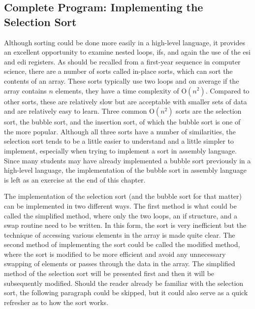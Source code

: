 \documentclass[10pt]{book}
\begin{document}
\subsection{Complete Program: Implementing the Selection Sort}
Although sorting could be done more easily in a high-level language, it provides an excellent opportunity to examine nested loops, ifs, and again the use of the esi and edi registers. As should be recalled from a first-year sequence in computer science, there are a number of sorts called in-place sorts, which can sort the contents of an array. These sorts typically use two loops and on average if the array contains $n$ elements, they have a time complexity of $\mathrm{O}\left(n^{2}\right)$. Compared to other sorts, these are relatively slow but are acceptable with smaller sets of data and are relatively easy to learn. Three common $\mathrm{O}\left(n^{2}\right)$ sorts are the selection sort, the bubble sort, and the insertion sort, of which the bubble sort is one of the more popular. Although all three sorts have a number of similarities, the selection sort tends to be a little easier to understand and a little simpler to implement, especially when trying to implement a sort in assembly language. Since many students may have already implemented a bubble sort previously in a high-level language, the implementation of the bubble sort in assembly language is left as an exercise at the end of this chapter.

The implementation of the selection sort (and the bubble sort for that matter) can be implemented in two different ways. The first method is what could be called the simplified method, where only the two loops, an if structure, and a swap routine need to be written. In this form, the sort is very inefficient but the technique of accessing various elements in the array is made quite clear. The second method of implementing the sort could be called the modified method, where the sort is modified to be more efficient and avoid any unnecessary swapping of elements or passes through the data in the array. The simplified method of the selection sort will be presented first and then it will be subsequently modified. Should the reader already be familiar with the selection sort, the following paragraph could be skipped, but it could also serve as a quick refresher as to how the sort works.
\end{document}
